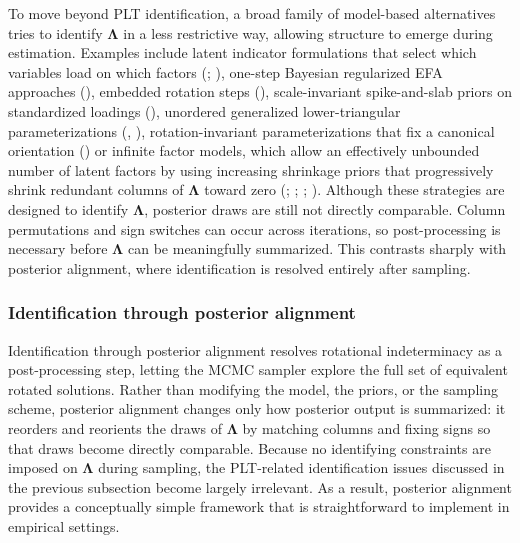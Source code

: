 \documentclass[
  man,
  longtable,
  nolmodern,
  notxfonts,
  notimes,
  colorlinks=true,linkcolor=blue,citecolor=blue,urlcolor=blue]{apa7}
\theoremstyle{plain}
\theoremstyle{plain}
\theoremstyle{remark}
\begin{document}
To move beyond PLT identification, a broad family of model-based
alternatives tries to identify \(\mathbf\Lambda\) in a less restrictive
way, allowing structure to emerge during estimation. Examples include
latent indicator formulations that select which variables load on which
factors (;
), one-step
Bayesian regularized EFA approaches (), embedded rotation steps (), scale-invariant spike-and-slab priors on standardized
loadings (), unordered
generalized lower-triangular parameterizations
(,
), rotation-invariant
parameterizations that fix a canonical orientation
() or infinite
factor models, which allow an effectively unbounded number of latent
factors by using increasing shrinkage priors that progressively shrink
redundant columns of \(\mathbf\Lambda\) toward zero
(;
;
;
). Although these
strategies are designed to identify \(\mathbf\Lambda\), posterior draws
are still not directly comparable. Column permutations and sign switches
can occur across iterations, so post-processing is necessary before
\(\mathbf\Lambda\) can be meaningfully summarized. This contrasts
sharply with posterior alignment, where identification is resolved
entirely after sampling.

\subsubsection{Identification through posterior
alignment}\label{identification-through-posterior-alignment}

Identification through posterior alignment resolves rotational
indeterminacy as a post-processing step, letting the MCMC sampler
explore the full set of equivalent rotated solutions. Rather than
modifying the model, the priors, or the sampling scheme, posterior
alignment changes only how posterior output is summarized: it reorders
and reorients the draws of \(\mathbf\Lambda\) by matching columns and
fixing signs so that draws become directly comparable. Because no
identifying constraints are imposed on \(\mathbf\Lambda\) during
sampling, the PLT-related identification issues discussed in the
previous subsection become largely irrelevant. As a result, posterior
alignment provides a conceptually simple framework that is
straightforward to implement in empirical settings.
\end{document}
